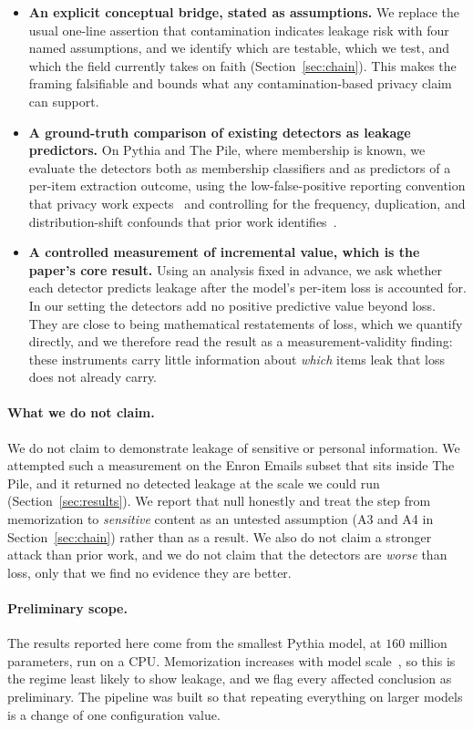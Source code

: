 \begin{itemize}
 \item \textbf{An explicit conceptual bridge, stated as assumptions.} We replace the
 usual one-line assertion that contamination indicates leakage risk with four named
 assumptions, and we identify which are testable, which we test, and which the field
 currently takes on faith (Section~\ref{sec:chain}). This makes the framing falsifiable
 and bounds what any contamination-based privacy claim can support.
 \item \textbf{A ground-truth comparison of existing detectors as leakage predictors.}
 On Pythia and The Pile, where membership is known, we evaluate the detectors both as
 membership classifiers and as predictors of a per-item extraction outcome, using the
 low-false-positive reporting convention that privacy work
 expects~\citep{carlini2022lira} and controlling for the frequency, duplication, and
 distribution-shift confounds that prior work
 identifies~\citep{biderman2023pythia,duan2024mia}.
 \item \textbf{A controlled measurement of incremental value, which is the paper's core
 result.} Using an analysis fixed in advance, we ask whether each detector predicts
 leakage after the model's per-item loss is accounted for. In our setting the detectors
 add no positive predictive value beyond loss. They are close to being mathematical
 restatements of loss, which we quantify directly, and we therefore read the result as a
 measurement-validity finding: these instruments carry little information about
 \emph{which} items leak that loss does not already carry.
\end{itemize}

\paragraph{What we do not claim.} We do not claim to demonstrate leakage of sensitive or
personal information. We attempted such a measurement on the Enron Emails subset that
sits inside The Pile, and it returned no detected leakage at the scale we could run
(Section~\ref{sec:results}). We report that null honestly and treat the step from
memorization to \emph{sensitive} content as an untested assumption
(A3 and A4 in Section~\ref{sec:chain}) rather than as a result. We also do not claim a
stronger attack than prior work, and we do not claim that the detectors are
\emph{worse} than loss, only that we find no evidence they are better.

\paragraph{Preliminary scope.} The results reported here come from the smallest Pythia
model, at $160$ million parameters, run on a CPU. Memorization increases with model
scale~\citep{carlini2023quantifying}, so this is the regime least likely to show
leakage, and we flag every affected conclusion as preliminary. The pipeline was built so
that repeating everything on larger models is a change of one configuration value.


